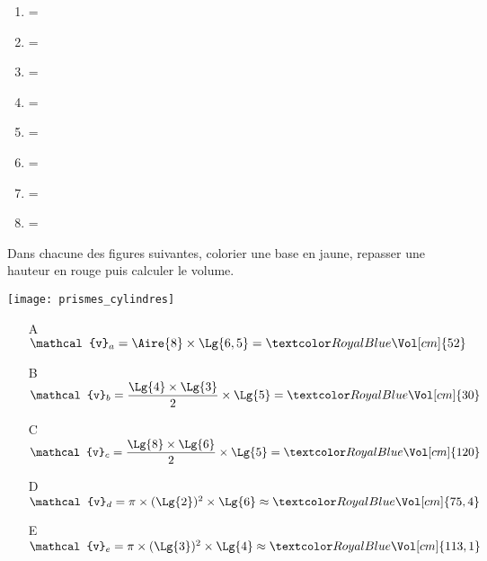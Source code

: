 \begin{Maquette}[Fiche,CorrigeFin,Colonnes=2]{}
\begin{multicols}{2}
         \begin{Solution}
            \begin{enumerate}
               \item {} = 
               \item {} = 
               \item {} = 
               \item {} = 
               \item {} = 
               \item {} = 
               \item {} = 
               \item {} = 
            \end{enumerate}
         \end{Solution}
         
         
         \begin{exercice} %
            Dans chacune des figures suivantes, colorier une base en jaune, repasser une hauteur en rouge puis calculer le volume.
            \begin{center}
               \texttt{[image: prismes\_cylindres]}
            \end{center}
         \end{exercice}
         
         \begin{Solution}
            \begin{itemize}
               \item[A] $\mathcal{v}_a =\Aire{8}\times\Lg{6,5} =\cor{\Vol[cm]{52}}$ \smallskip
               \item[B] $\mathcal{v}_b =\dfrac{\Lg{4}\times\Lg{3}}{2}\times\Lg{5} =\cor{\Vol[cm]{30}}$ \smallskip
               \item[C] $\mathcal{v}_c =\dfrac{\Lg{8}\times\Lg{6}}{2}\times\Lg{5} =\cor{\Vol[cm]{120}}$ \smallskip
               \item[D] $\mathcal{v}_d =\pi\times(\Lg{2})^2\times\Lg{6} \approx\cor{\Vol[cm]{75,4}}$ \smallskip
               \item[E] $\mathcal{v}_e =\pi\times(\Lg{3})^2\times\Lg{4} \approx\cor{\Vol[cm]{113,1}}$
            \end{itemize}
         \end{Solution}
         

\end{multicols}
\end{Maquette}

